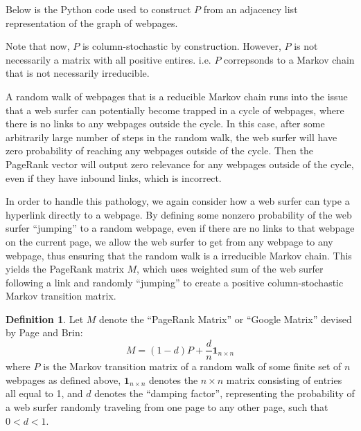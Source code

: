\documentclass[11pt]{article}
\theoremstyle{definition}
\newtheorem{definition}[theorem]{Definition}
\renewcommand{\vec}[1]{\mathbf{#1}}
\begin{document}
Below is the Python code used to construct $P$ from an adjacency list representation of the graph of webpages.




Note that now, $P$ is column-stochastic by construction. However, $P$ is not necessarily a matrix with all positive entires.
i.e. $P$ correpsonds to a Markov chain that is not necessarily irreducible.

A random walk of webpages that is a reducible Markov chain runs into the issue that a web surfer can potentially become trapped in a cycle of webpages,
where there is no links to any webpages outside the cycle.
In this case, after some arbitrarily large number of steps in the random walk,
the web surfer will have zero probability of reaching any webpages outside of the cycle.
Then the PageRank vector will output zero relevance for any webpages outside of the cycle, even if they have inbound links, which is incorrect. 

In order to handle this pathology, we again consider how a web surfer can type a hyperlink directly to a webpage.
By defining some nonzero probability of the web surfer ``jumping'' to a random webpage, even if there are no links to that webpage on the current page,
we allow the web surfer to get from any webpage to any webpage, thus ensuring that the random walk is a irreducible Markov chain.
This yields the PageRank matrix $M$, which uses weighted sum of the web surfer following a link and randomly ``jumping'' to create a positive column-stochastic Markov transition matrix.

\begin{definition}
    Let $M$ denote the ``PageRank Matrix'' or ``Google Matrix'' devised by Page and Brin:
    $$M = (1-d)P + \frac{d}{n} \vec{1}_{n \times n}$$
    where $P$ is the Markov transition matrix of a random walk of some finite set of $n$ webpages as defined above,
    $\vec{1}_{n \times n}$ denotes the $n \times n$ matrix consisting of entries all equal to 1,
    and $d$ denotes the ``damping factor'', representing the probability of a web surfer randomly traveling from one page to any other page,
    such that $0 < d < 1$.
\end{definition}
\end{document}
